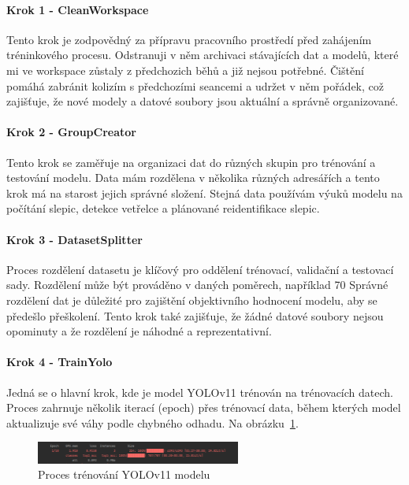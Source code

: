\paragraph*{Krok 1 - CleanWorkspace}

Tento krok je zodpovědný za přípravu pracovního prostředí před zahájením tréninkového procesu.
Odstranuji v něm archivaci stávajících dat a modelů, které mi ve workspace zůstaly z předchozich běhů a již nejsou potřebné.
Čištění pomáhá zabránit kolizím s předchozími seancemi a udržet v něm pořádek, což zajišťuje, že nové modely a datové soubory jsou aktuální a správně organizované.

\paragraph*{Krok 2 - GroupCreator}

Tento krok se zaměřuje na organizaci dat do různých skupin pro trénování a testování modelu.
Data mám rozdělena v několika různých adresářích a tento krok má na starost jejich správné složení.
Stejná data používám výuků modelu na počítání slepic, detekce vetřelce a plánované reidentifikace slepic.

\paragraph*{Krok 3 - DatasetSplitter}

Proces rozdělení datasetu je klíčový pro oddělení trénovací, validační a testovací sady.
Rozdělení může být prováděno v daných poměrech, například 70%
Správné rozdělení dat je důležité pro zajištění objektivního hodnocení modelu, aby se předešlo přeškolení.
Tento krok také zajišťuje, že žádné datové soubory nejsou opominuty a že rozdělení je náhodné a reprezentativní.

\paragraph*{Krok 4 - TrainYolo}

Jedná se o hlavní krok, kde je model YOLOv11 trénován na trénovacích datech.
Proces zahrnuje několik iterací (epoch) přes trénovací data, během kterých model aktualizuje své váhy podle chybného odhadu.
Na obrázku~\ref{fig:train_yolo}.


\begin{figure}[htbp]
    \centering
    \includegraphics[width=0.6\textwidth]{img/train_yolo}
    \caption{Proces trénování YOLOv11 modelu}
    \label{fig:train_yolo}
\end{figure}

